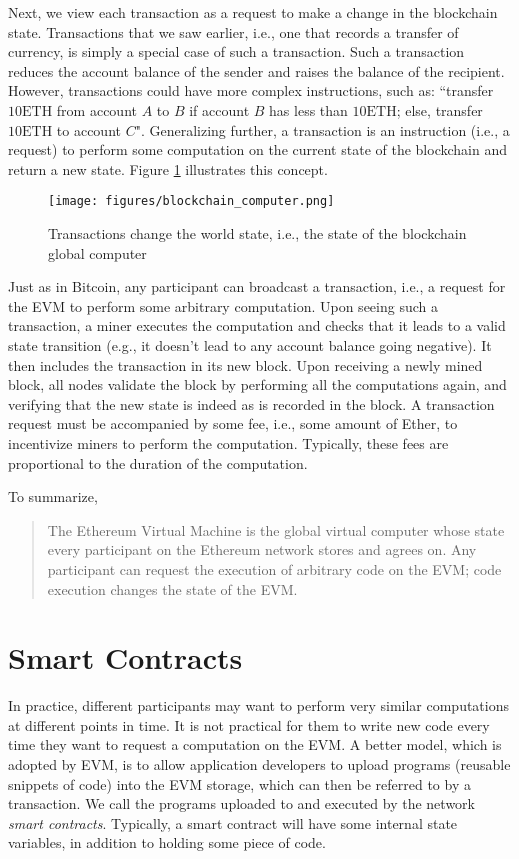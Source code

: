 \documentclass{article}
\begin{document}
Next, we view each transaction as a request to make a change in the blockchain state. Transactions that we saw earlier, i.e., one that records a transfer of currency, is simply a special case of such a transaction. Such a transaction reduces the account balance of the sender and raises the balance of the recipient. However, transactions could have more complex instructions, such as: ``transfer $10 \text{ETH}$ from account $A$ to $B$ if account $B$ has less than $10 \text{ETH}$; else, transfer $10 \text{ETH}$ to account $C$". Generalizing further, a transaction is an instruction (i.e., a request) to perform some computation on the current state of the blockchain and return a new state. Figure \ref{fig:blockchain_computer} illustrates this concept. 

\begin{figure}[htbp]
    \centering
    \texttt{[image: figures/blockchain\_computer.png]}
    \caption{Transactions change the world state, i.e., the state of the blockchain global computer}
    \label{fig:blockchain_computer}
\end{figure}

Just as in Bitcoin, any participant can broadcast a transaction, i.e., a request for the EVM to perform some arbitrary computation. Upon seeing such a transaction, a miner executes the computation and checks that it leads to a valid state transition (e.g., it doesn't lead to any account balance going negative). It then includes the transaction in its new block. Upon receiving a newly mined block, all nodes validate the block by performing all the computations again,  and verifying that the new state is indeed as is recorded in the block. A transaction request must be accompanied by some fee, i.e., some amount of Ether, to incentivize miners to perform the computation. Typically, these fees are proportional to the duration of the computation.

To summarize,
\begin{quote}
    The Ethereum Virtual Machine is the global virtual computer whose state every participant on the Ethereum network stores and agrees on. Any participant can request the execution of arbitrary code on the EVM; code execution changes the state of the EVM.
\end{quote}

\section*{Smart Contracts}
In practice, different participants may want to perform very similar computations at different points in time. It is not practical for them to write new code every time they want to request a computation on the EVM. A better model, which is adopted by EVM, is to allow application developers to upload programs (reusable snippets of code) into the EVM storage, which can then be referred to by a transaction. We call the programs uploaded to and executed by the network \textit{smart contracts}. Typically, a smart contract will have some internal state variables, in addition to holding some piece of code. 
\end{document}
